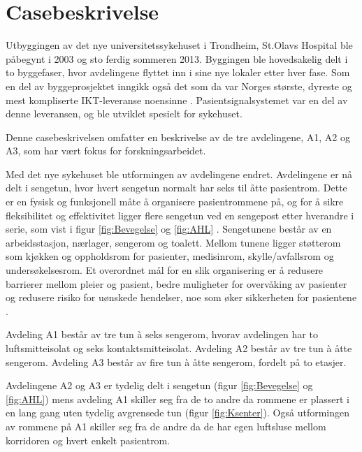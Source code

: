 \chapter{Casebeskrivelse}
\label{chp:case}
Utbyggingen av det nye universitetssykehuset i Trondheim, St.Olavs Hospital ble påbegynt i 2003 og sto ferdig sommeren 2013. Byggingen ble hovedsakelig delt i to byggefaser, hvor avdelingene flyttet inn i sine nye lokaler etter hver fase. Som en del av byggeprosjektet inngikk også det som da var Norges største, dyreste og mest kompliserte IKT-leveranse noensinne \citep{TU}. Pasientsignalsystemet var en del av denne leveransen, og ble utviklet spesielt for sykehuset. 

\noindent
Denne casebeskrivelsen omfatter en beskrivelse av de tre avdelingene, A1, A2 og A3, som har vært fokus for forskningsarbeidet. 

\noindent
Med det nye sykehuset ble utformingen av avdelingene endret. Avdelingene er nå delt i sengetun, hvor hvert sengetun normalt har seks til åtte pasientrom. Dette er en fysisk og funksjonell måte å organisere pasientrommene på, og for å sikre fleksibilitet og effektivitet ligger flere sengetun ved en sengepost etter hverandre i serie, som vist i figur \ref{fig:Bevegelse} og \ref{fig:AHL} \citep{Aslaksen, sykehuskart}. Sengetunene består av en arbeidsstasjon, nærlager, sengerom og toalett. Mellom tunene ligger støtterom som kjøkken og oppholdsrom for pasienter, medisinrom, skylle/avfallsrom og undersøkelsesrom. Et overordnet mål for en slik organisering er å redusere barrierer mellom pleier og pasient, bedre muligheter for overvåking av pasienter og redusere risiko for uønskede hendelser, noe som øker sikkerheten for pasientene \citep{Sintef-sengetun}.

\noindent
Avdeling A1 består av tre tun à seks sengerom, hvorav avdelingen har to luftsmitteisolat og seks kontaktsmitteisolat. Avdeling A2 består av tre tun à åtte sengerom. Avdeling A3 består av fire tun à åtte sengerom, fordelt på to etasjer.

\noindent
Avdelingene A2 og A3 er tydelig delt i sengetun (figur \ref{fig:Bevegelse} og \ref{fig:AHL}) mens avdeling A1 skiller seg fra de to andre da rommene er plassert i en lang gang uten tydelig avgrensede tun (figur \ref{fig:Ksenter}). Også utformingen av rommene på A1 skiller seg fra de andre da de har egen luftsluse mellom korridoren og hvert enkelt pasientrom.

